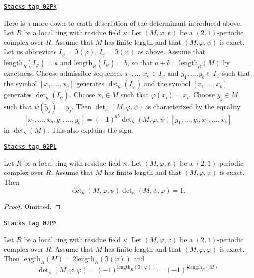 \begin{remark}
\label{chow-remark-more-elementary}
\href{https://stacks.math.columbia.edu/tag/02PK}{\texttt{Stacks tag 02PK}}

Here is a more down to earth description of the determinant
introduced above. Let $R$ be a local ring with residue field $\kappa$.
Let $(M, \varphi, \psi)$ be a $(2, 1)$-periodic complex over $R$.
Assume that $M$ has finite length and that $(M, \varphi, \psi)$ is
exact. Let us abbreviate $I_\varphi = \Im(\varphi)$,
$I_\psi = \Im(\psi)$ as above.
Assume that $\text{length}_R(I_\varphi) = a$ and
$\text{length}_R(I_\psi) = b$, so that $a + b = \text{length}_R(M)$
by exactness. Choose admissible sequences
$x_1, \ldots, x_a \in I_\varphi$ and $y_1, \ldots, y_b \in I_\psi$
such that the symbol $[x_1, \ldots, x_a]$ generates $\det_\kappa(I_\varphi)$
and the symbol $[x_1, \ldots, x_b]$ generates $\det_\kappa(I_\psi)$.
Choose $\tilde x_i \in M$ such that $\varphi(\tilde x_i) = x_i$.
Choose $\tilde y_j \in M$ such that $\psi(\tilde y_j) = y_j$.
Then $\det_\kappa(M, \varphi, \psi)$ is characterized
by the equality
$$
[x_1, \ldots, x_a, \tilde y_1, \ldots, \tilde y_b]
=
(-1)^{ab} \det\nolimits_\kappa(M, \varphi, \psi)
[y_1, \ldots, y_b, \tilde x_1, \ldots, \tilde x_a]
$$
in $\det_\kappa(M)$. This also explains the sign.
\end{remark}

\begin{lemma}
\label{chow-lemma-periodic-determinant-shift}
\href{https://stacks.math.columbia.edu/tag/02PL}{\texttt{Stacks tag 02PL}}

Let $R$ be a local ring with residue field $\kappa$.
Let $(M, \varphi, \psi)$ be a $(2, 1)$-periodic complex over $R$.
Assume that $M$ has finite length and that $(M, \varphi, \psi)$ is
exact. Then
$$
\det\nolimits_\kappa(M, \varphi, \psi)
\det\nolimits_\kappa(M, \psi, \varphi)
= 1.
$$
\end{lemma}

\begin{proof}
Omitted.
\end{proof}

\begin{lemma}
\label{chow-lemma-periodic-determinant-sign}
\href{https://stacks.math.columbia.edu/tag/02PM}{\texttt{Stacks tag 02PM}}

Let $R$ be a local ring with residue field $\kappa$.
Let $(M, \varphi, \varphi)$ be a $(2, 1)$-periodic complex over $R$.
Assume that $M$ has finite length and that $(M, \varphi, \varphi)$ is
exact. Then $\text{length}_R(M) = 2 \text{length}_R(\Im(\varphi))$
and
$$
\det\nolimits_\kappa(M, \varphi, \varphi)
=
(-1)^{\text{length}_R(\Im(\varphi))}
=
(-1)^{\frac{1}{2}\text{length}_R(M)}
$$
\end{lemma}

